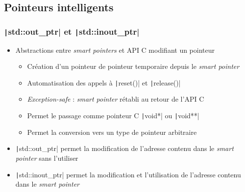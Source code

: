 \documentclass[C++.tex]{subfiles}
\begin{document}
\subsection*{Pointeurs intelligents}
\begin{frame}[fragile]
	\frametitle{\texttt|std::out_ptr| et \texttt|std::inout_ptr|}
	\begin{itemize}
		\item Abstractions entre \textit{smart pointers} et API C modifiant un pointeur
		\begin{itemize}
			\item Création d'un pointeur de pointeur temporaire depuis le \textit{smart pointer}
			\item Automatisation des appels à \texttt|reset()| et \texttt|release()|
			\item \textit{Exception-safe} : \textit{smart pointer} rétabli au retour de l'API C


			\item Permet le passage comme pointeur C \texttt|void*| ou \texttt|void**|
			\item Permet la conversion vers un type de pointeur arbitraire
		\end{itemize}
		\item \texttt|std::out_ptr| permet la modification de l'adresse contenu dans le \textit{smart pointer} sans l'utiliser
		\item \texttt|std::inout_ptr| permet la modification et l'utilisation de l'adresse contenu dans le \textit{smart pointer}
	\end{itemize}



\end{frame}
\end{document}
